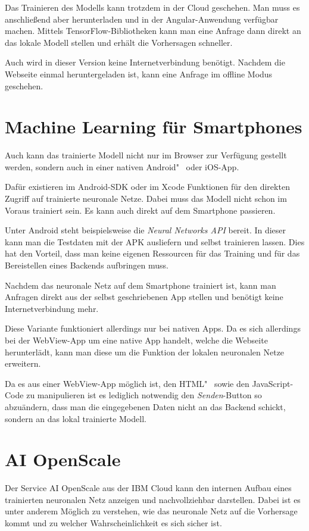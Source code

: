 Das Trainieren des Modells kann trotzdem in der Cloud geschehen. Man muss es anschließend aber herunterladen und in der
Angular-Anwendung verfügbar machen. Mittels TensorFlow-Bibliotheken kann man eine Anfrage dann direkt an das lokale
Modell stellen und erhält die Vorhersagen schneller.

Auch wird in dieser Version keine Internetverbindung benötigt. Nachdem die Webseite einmal heruntergeladen ist, kann
eine Anfrage im offline Modus geschehen.

\section{Machine Learning für Smartphones}
Auch kann das trainierte Modell nicht nur im Browser zur Verfügung gestellt werden, sondern auch in einer nativen
Android"~ oder iOS-App.

Dafür existieren im Android-SDK oder im Xcode Funktionen für den direkten Zugriff auf trainierte neuronale Netze. Dabei
muss das Modell nicht schon im Voraus trainiert sein. Es kann auch direkt auf dem Smartphone passieren.

Unter Android steht beispielsweise die \textit{Neural Networks API} bereit. In dieser kann man die Testdaten mit der APK
ausliefern und selbst trainieren lassen. Dies hat den Vorteil, dass man keine eigenen Ressourcen für das Training und
für das Bereistellen eines Backends aufbringen muss.

Nachdem das neuronale Netz auf dem Smartphone trainiert ist, kann man Anfragen direkt aus der selbst geschriebenen App
stellen und benötigt keine Internetverbindung mehr.

Diese Variante funktioniert allerdings nur bei nativen Apps. Da es sich allerdings bei der WebView-App um eine native
App handelt, welche die Webseite herunterlädt, kann man diese um die Funktion der lokalen neuronalen Netze erweitern.

Da es aus einer WebView-App möglich ist, den HTML"~ sowie den JavaScript-Code zu manipulieren ist es lediglich notwendig
den \textit{Senden}-Button so abzuändern, dass man die eingegebenen Daten nicht an das Backend schickt, sondern an das
lokal trainierte Modell.

\section{AI OpenScale}
\label{ai_openscale}
Der Service AI OpenScale aus der IBM Cloud kann den internen Aufbau eines trainierten neuronalen Netz anzeigen und
nachvollziehbar darstellen. Dabei ist es unter anderem Möglich zu verstehen, wie das neuronale Netz auf die Vorhersage
kommt und zu welcher Wahrscheinlichkeit es sich sicher ist.

